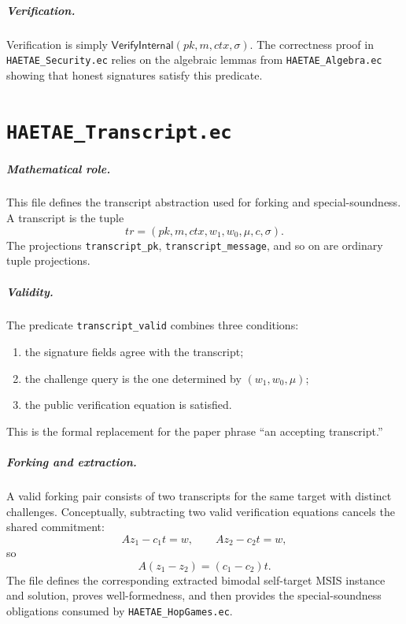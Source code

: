\documentclass[11pt]{report}
\newcommand{\file}[1]{\nolinkurl{#1}}
\newcommand{\ec}[1]{\nolinkurl{#1}}
\newcommand{\ecchapter}[2]{\chapter{\texorpdfstring{\texttt{#1}}{#2}}}
\theoremstyle{definition}
\theoremstyle{plain}
\theoremstyle{definition}
\begin{document}
\paragraph{Verification.}
Verification is simply \(\mathsf{VerifyInternal}(pk,m,ctx,\sigma)\).  The
correctness proof in \file{HAETAE_Security.ec} relies on the algebraic lemmas
from \file{HAETAE_Algebra.ec} showing that honest signatures satisfy this
predicate.



\ecchapter{HAETAE\_Transcript.ec}{HAETAE Transcript.ec}

\paragraph{Mathematical role.}
This file defines the transcript abstraction used for forking and
special-soundness.  A transcript is the tuple
\[
  tr=(pk,m,ctx,w_1,w_0,\mu,c,\sigma).
\]
The projections \ec{transcript_pk}, \ec{transcript_message}, and so on are
ordinary tuple projections.

\paragraph{Validity.}
The predicate \ec{transcript_valid} combines three conditions:
\begin{enumerate}[leftmargin=*]
  \item the signature fields agree with the transcript;
  \item the challenge query is the one determined by \((w_1,w_0,\mu)\);
  \item the public verification equation is satisfied.
\end{enumerate}
This is the formal replacement for the paper phrase ``an accepting
transcript.''

\paragraph{Forking and extraction.}
A valid forking pair consists of two transcripts for the same target with
distinct challenges.  Conceptually, subtracting two valid verification
equations cancels the shared commitment:
\[
  A z_1 - c_1 t = w,\qquad
  A z_2 - c_2 t = w,
\]
so
\[
  A(z_1-z_2) = (c_1-c_2)t.
\]
The file defines the corresponding extracted bimodal self-target MSIS instance
and solution, proves well-formedness, and then provides the special-soundness
obligations consumed by \file{HAETAE_HopGames.ec}.
\end{document}
